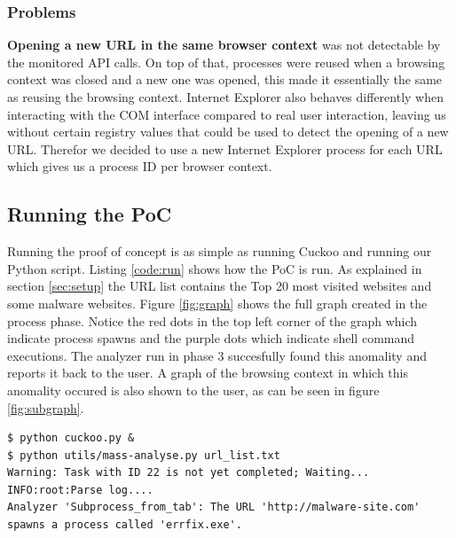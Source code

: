 \subsubsection{Problems}

\textbf{Opening a new URL in the same browser context} was not detectable by the monitored API calls. On top of that, processes were reused when a browsing context was closed and a new one was opened, this made it essentially the same as reusing the browsing context. Internet Explorer also behaves differently when interacting with the COM interface compared to real user interaction, leaving us without certain registry values that could be used to detect the opening of a new URL. Therefor we decided to use a new Internet Explorer process for each URL which gives us a process ID per browser context.

\subsection{Running the PoC}

Running the proof of concept is as simple as running Cuckoo and running our Python script. Listing \ref{code:run} shows how the PoC is run. As explained in section \ref{sec:setup} the URL list contains the Top 20 most visited websites and some malware websites. Figure \ref{fig:graph} shows the full graph created in the process phase. Notice the red dots in the top left corner of the graph which indicate process spawns and the purple dots which indicate shell command executions. The analyzer run in phase 3 succesfully found this anomality and reports it back to the user. A graph of the browsing context in which this anomality occured is also shown to the user, as can be seen in figure \ref{fig:subgraph}.

\begin{lstlisting}[caption={Amazing},label={code:run}]
$ python cuckoo.py &
$ python utils/mass-analyse.py url_list.txt
Warning: Task with ID 22 is not yet completed; Waiting...
INFO:root:Parse log....
Analyzer 'Subprocess_from_tab': The URL 'http://malware-site.com' spawns a process called 'errfix.exe'.
\end{lstlisting}

\pagebreak

